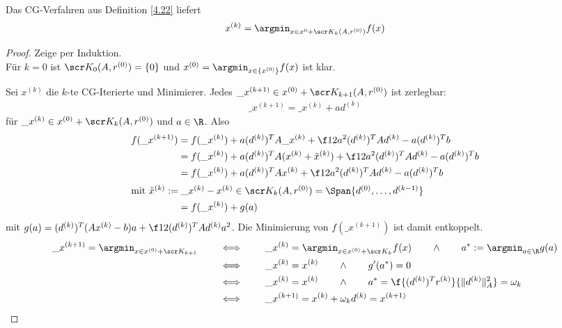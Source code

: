 \documentclass[11pt]{scrbook}
\begin{document}
\begin{st} \label{4.23}
	Das CG-Verfahren aus Definition \ref{4.22} liefert
	\[
		x^{(k)} = \argmin_{x \in x^{0} + \scr K_k(A, r^{(0)})} f(x)
	\]
	\begin{proof}
		Zeige per Induktion. \\
		Für $k=0$ ist $\scr K_0(A, r^{(0)}) = \{0\}$ und $x^{(0)} = \argmin_{x \in \{x^{(0)}\}} f(x)$ ist klar.

		Sei $x^{(k)}$ die $k$-te CG-Iterierte und Minimierer.
		Jedes $\_x^{(k+1)} \in x^{(0)} + \scr K_{k+1}(A, r^{(0)})$ ist zerlegbar:
		\begin{align*}
			\_x^{(k+1)} = \_x^{(k)} + ad^{(k)} 
		\end{align*}
		für $\_x^{(k)} \in x^{(0)} + \scr K_k (A, r^{(0)})$ und $a \in \R$.
		Also
		\begin{align*}
			f(\_x^{(k+1)}) 
			&= f(\_x^{(k)}) + a(d^{(k)})^T A \_x^{(k)} + \f 12 a^2 (d^{(k)})^T A d^{(k)} - a(d^{(k)})^T b \\
			&= f(\_x^{(k)}) + a(d^{(k)})^T A (x^{(k)} + \tilde x^{(k)}) + \f 12 a^2 (d^{(k)})^T A d^{(k)} - a(d^{(k)})^T b \\
			&= f(\_x^{(k)}) + a (d^{(k)})^T A x^{(k)}  + \f 12 a^2 (d^{(k)})^T A d^{(k)} - a(d^{(k)})^T b \\
			\intertext{mit $\tilde x^{(k)} := \_x^{(k)}- x^{(k)} \in \scr K_k(A, r^{(0)}) = \Span \{d^{(0)}, \dotsc, d^{(k-1)}\}$}
			&= f(\_x^{(k)}) + g(a)
		\end{align*}
		mit $g(a) = (d^{(k)})^T (Ax^{(k)} - b)a + \f 12 (d^{(k)})^T A d^{(k)} a^2$.
		Die Minimierung von $f(\_x^{(k+1)})$ ist damit entkoppelt.
		\begin{align*}
			\_x^{(k+1)} = \argmin_{x\in x^{(0)} + \scr K_{k+1}}
			\qquad &\iff \qquad \_x^{(k)} = \argmin_{x \in x^{(0)} + \scr K_k} f(x) \qquad\land\qquad a^* := \argmin_{a\in \R} g(a) \\
			\qquad &\iff \qquad \_x^{(k)} = x^{(k)} \qquad \land \qquad g'(a^*) = 0 \\
			\qquad &\iff \qquad \_x^{(k)} = x^{(k)} \qquad \land \qquad a^* = \f {(d^{(k)})^T r^{(k)}}{\|d^{(k)}\|_A^2} = \omega_k \\
			\qquad &\iff \qquad \_x^{(k+1)} = x^{(k)}  + \omega_k d^{(k)} = x^{(k+1)}
		\end{align*}
	\end{proof}
\end{st}
\end{document}
